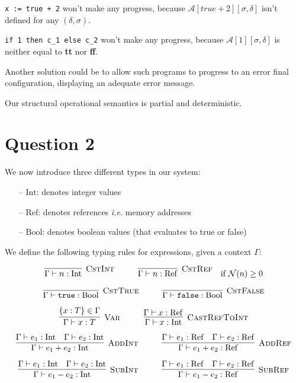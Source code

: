 \documentclass{article}
\newcommand{\Aa}[2]{\mathcal{A}\left[#1\right]\left[#2\right]}
\newcommand{\N}{\mathcal{N}}
\newcommand{\Rule}[3]{\infer[\textsc{#1}]{#2}{#3}}
\newcommand{\Ref}{\mathrm{Ref}}
\newcommand{\Int}{\mathrm{Int}}
\newcommand{\Bool}{\mathrm{Bool}}
\newcommand{\ie}{\emph{i.e.}}
\begin{document}
\texttt{x := true + 2} won't make any progress, because $\Aa{true + 2}{\sigma,\delta}$ isn't defined for any $(\delta,\sigma)$.

\texttt{if 1 then c\_1 else c\_2} won't make any progress, because $\Aa{1}{\sigma,\delta}$ is neither equal to \textbf{tt} nor \textbf{ff}.

Another solution could be to allow such programs to progress to an error final configuration, displaying an adequate error message.

Our structural operational semantics is partial and deterministic.

\section*{Question 2}

We now introduce three different types in our system:

\begin{itemize}
	\itemsep0em
	\item[--] $\Int{}$: denotes integer values
	\item[--] $\Ref{}$: denotes references \ie{} memory addresses
	\item[--] $\Bool{}$: denotes boolean values (that evaluates to true or false)
\end{itemize}

We define the following typing rules for expressions, given a context $\Gamma$:

\[
\Rule{CstInt}{\Gamma \vdash n: \Int}{}
\hspace*{1cm}
\Rule{CstRef}{\Gamma \vdash n: \Ref}{} \quad \text{if $\N(n) \geq 0$}
\]

\[
\Rule{CstTrue}{\Gamma \vdash \texttt{true}: \Bool}{}
\hspace*{1cm}
\Rule{CstFalse}{\Gamma \vdash \texttt{false}: \Bool}{}
\]

\[
\Rule{Var}{\Gamma \vdash x: T}{\lbrace x: T \rbrace \in \Gamma}
\hspace*{1cm}
\Rule{CastRefToInt}{\Gamma \vdash x: \Int}{\Gamma \vdash x: \Ref}
\]

\[
\Rule{AddInt}{\Gamma \vdash e_1 + e_2: \Int}{\Gamma \vdash e_1: \Int \quad \Gamma \vdash e_2: \Int}
\hspace*{1cm}
\Rule{AddRef}{\Gamma \vdash e_1 + e_2: \Ref}{\Gamma \vdash e_1: \Ref \quad \Gamma \vdash e_2: \Ref}
\]

\[
\Rule{SubInt}{\Gamma \vdash e_1 - e_2: \Int}{\Gamma \vdash e_1: \Int \quad \Gamma \vdash e_2: \Int}
\hspace*{1cm}
\Rule{SubRef}{\Gamma \vdash e_1 - e_2: \Ref}{\Gamma \vdash e_1: \Ref \quad \Gamma \vdash e_2: \Ref}
\]
\end{document}
